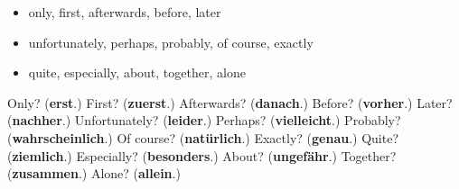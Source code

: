 \begin{itemize}
\raggedright
  \item only, first, afterwards, before, later
  \item unfortunately, perhaps, probably, of course, exactly
  \item quite, especially, about, together, alone
\end{itemize}

\begin{tcolorbox}[breakable,colback=teal!4,colframe=teal!35!black,title={Before you move on}]
Only? (\textbf{erst}.) First? (\textbf{zuerst}.) Afterwards? (\textbf{danach}.) Before? (\textbf{vorher}.) Later? (\textbf{nachher}.) Unfortunately? (\textbf{leider}.) Perhaps? (\textbf{vielleicht}.) Probably? (\textbf{wahrscheinlich}.) Of course? (\textbf{natürlich}.) Exactly? (\textbf{genau}.) Quite? (\textbf{ziemlich}.) Especially? (\textbf{besonders}.) About? (\textbf{ungefähr}.) Together? (\textbf{zusammen}.) Alone? (\textbf{allein}.)
\end{tcolorbox}

